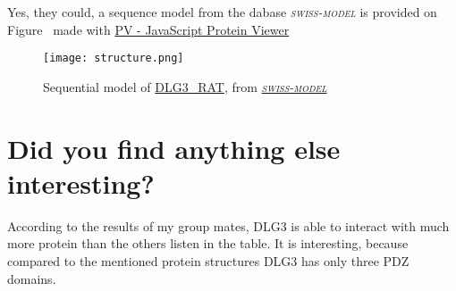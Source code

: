 Yes, they could, a sequence model from the dabase \emph{\textsc{swiss-model}} is provided on Figure \ made with \href{http://biasmv.github.io/pv/}{PV - JavaScript Protein Viewer}

\begin{figure}
\centering
\texttt{[image: structure.png]}
\caption{Sequential model of \url{DLG3_RAT}, from \href{https://modbase.compbio.ucsf.edu/modbase-cgi/model_details.cgi?queryfile=1479394245_9811&searchmode=default&displaymode=moddetail&referer=yes&snpflag=&}{\emph{\textsc{swiss-model}}}}
\label{structure}
\end{figure}

\section{Did you find anything else interesting?}
According to the results of my group mates, DLG3 is able to interact with much more protein than the others listen in the table.
It is interesting, because compared to the mentioned protein structures DLG3 has only three PDZ domains.